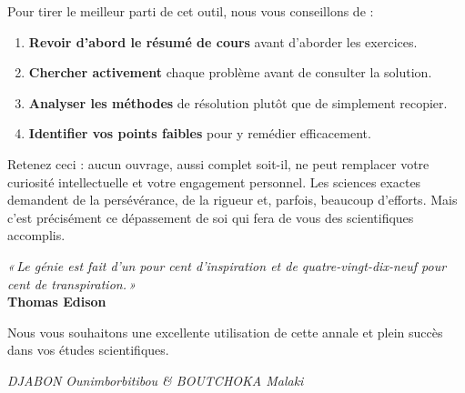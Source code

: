 \documentclass[12pt,a4paper]{article}
\begin{document}
Pour tirer le meilleur parti de cet outil, nous vous conseillons de :

\begin{enumerate}
  \item \textbf{Revoir d'abord le résumé de cours} avant d'aborder les exercices.
  \item \textbf{Chercher activement} chaque problème avant de consulter la solution.
  \item \textbf{Analyser les méthodes} de résolution plutôt que de simplement recopier.
  \item \textbf{Identifier vos points faibles} pour y remédier efficacement.
\end{enumerate}

Retenez ceci : aucun ouvrage, aussi complet soit-il, ne peut remplacer votre curiosité intellectuelle et votre engagement personnel. Les sciences exactes demandent de la persévérance, de la rigueur et, parfois, beaucoup d'efforts. Mais c'est précisément ce dépassement de soi qui fera de vous des scientifiques accomplis.

\begin{flushright}
\emph{«\,Le génie est fait d'un pour cent d'inspiration et de quatre-vingt-dix-neuf pour cent de transpiration.\,»}\\
\textbf{Thomas Edison}
\end{flushright}

Nous vous souhaitons une excellente utilisation de cette annale et plein succès dans vos études scientifiques.

\vspace{1cm}
\begin{flushright}
\textit{DJABON Ounimborbitibou \& BOUTCHOKA Malaki}
\end{flushright}

\newpage
\tableofcontents
\newpage
\end{document}
